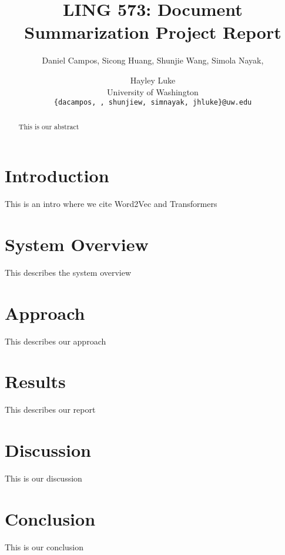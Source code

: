 \documentclass[11pt]{article}
\title{LING 573: Document Summarization Project Report}
\author{Daniel Campos, Sicong Huang, Shunjie Wang, Simola Nayak, \and Hayley Luke \\ University of Washington \\ {\tt \{dacampos, , shunjiew, simnayak, jhluke\}@uw.edu}}
\date{}
\begin{document}
\maketitle
\begin{abstract}
This is our abstract
\end{abstract}
\section{Introduction}
This is an intro where we cite Word2Vec \cite{Mikolov2013DistributedRO} and Transformers \cite{Wolf2019HuggingFacesTS}
\section{System Overview}
This describes the system overview
\section{Approach}
This describes our approach
\section{Results}
This describes our report
\section{Discussion}
This is our discussion
\section{Conclusion}
This is our conclusion


\end{document}
